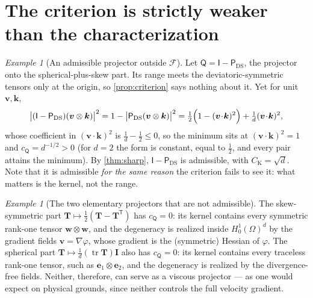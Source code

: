 \documentclass[11pt]{article}
\theoremstyle{plain}
\theoremstyle{definition}
\theoremstyle{remark}
\newtheorem{example}[theorem]{Example}
\newcommand{\IPi}{\mathsf{I}}
\newcommand{\AnyProj}{\mathsf{Q}}
\newcommand{\DSPi}{\mathsf{P}_{\mathrm{DS}}}
\newcommand{\bv}{\boldsymbol{v}}
\newcommand{\bw}{\boldsymbol{w}}
\newcommand{\bk}{\boldsymbol{k}}
\newcommand{\be}{\boldsymbol{e}}
\newcommand{\CK}{C_{\mathrm{K}}}
\newcommand{\cP}{c_{\AnyProj}}
\begin{document}
\section{The criterion is strictly weaker than the characterization}\label{sec:gap}

\begin{example}[An admissible projector outside $\mathcal{F}$]\label{ex:complement}
Let $\AnyProj=\IPi-\DSPi$, the projector onto the spherical{-}plus{-}skew part. Its range meets
the deviatoric{-}symmetric tensors only at the origin, so \cref{prop:criterion} says nothing
about it. Yet for unit $\bv,\bk$,
\begin{equation}\label{eq:complement-c}
  \bigl|(\IPi-\DSPi)(\bv\otimes\bk)\bigr|^2
  = 1 - \bigl|\DSPi(\bv\otimes\bk)\bigr|^2
  = \tfrac12\Bigl(1-(\bv\!\cdot\!\bk)^2\Bigr) + \tfrac1d(\bv\!\cdot\!\bk)^2 ,
\end{equation}
whose coefficient in $(\bv\!\cdot\!\bk)^2$ is $\tfrac1d-\tfrac12\le0$, so the minimum
sits at $(\bv\!\cdot\!\bk)^2=1$ and $\cP=d^{-1/2}>0$ (for $d=2$ the form is constant,
equal to $\tfrac12$, and every pair attains the minimum). By
\cref{thm:sharp}, $\IPi-\DSPi$ is admissible, with $\CK=\sqrt d$. Note that it is
admissible \emph{for the same reason} the criterion fails to see it: what matters is the
kernel, not the range.
\end{example}

\begin{example}[The two elementary projectors that are not admissible]\label{ex:failures}
The skew{-}symmetric part $\mathbf{T}\mapsto\tfrac12(\mathbf{T}-\mathbf{T}^{\mathsf T})$ has
$\cP=0$: its kernel contains every symmetric rank{-}one tensor $\bw\otimes\bw$, and the
degeneracy is realized inside $H^1_0(\Omega)^d$ by the gradient fields $\bv=\nabla\varphi$,
whose gradient is the (symmetric) Hessian of $\varphi$. The spherical part
$\mathbf{T}\mapsto\tfrac1d(\operatorname{tr}\mathbf{T})\mathbf{I}$ also has $\cP=0$: its kernel
contains every traceless rank{-}one tensor, such as $\be_1\otimes\be_2$, and the degeneracy is
realized by the divergence{-}free fields. Neither, therefore, can serve as a viscous projector
--- as one would expect on physical grounds, since neither controls the full velocity gradient.
\end{example}
\end{document}

